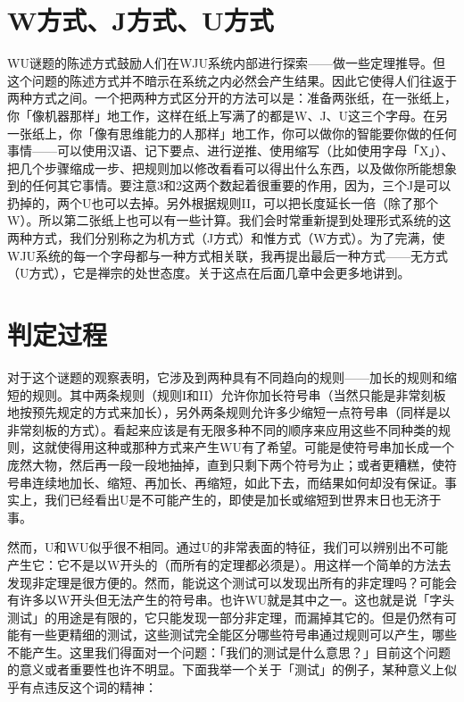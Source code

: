 \documentclass[
  12pt,
  twoside,
  openright,
  oldfontcommands,
]{memoir}
\begin{document}
\section{W方式、J方式、U方式}

WU谜题的陈述方式鼓励人们在WJU系统内部进行探索------做一些定理推导。但这个问题的陈述方式并不暗示在系统之内必然会产生结果。因此它使得人们往返于两种方式之间。一个把两种方式区分开的方法可以是：准备两张纸，在一张纸上，你「像机器那样」地工作，这样在纸上写满了的都是W、J、U这三个字母。在另一张纸上，你「像有思维能力的人那样」地工作，你可以做你的智能要你做的任何事情------可以使用汉语、记下要点、进行逆推、使用缩写（比如使用字母「X」）、把几个步骤缩成一步、把规则加以修改看看可以得出什么东西，以及做你所能想象到的任何其它事情。要注意3和2这两个数起着很重要的作用，因为，三个J是可以扔掉的，两个U也可以去掉。另外根据规则II，可以把长度延长一倍（除了那个W）。所以第二张纸上也可以有一些计算。我们会时常重新提到处理形式系统的这两种方式，我们分别称之为机方式（J方式）和惟方式（W方式）。为了完满，使WJU系统的每一个字母都与一种方式相关联，我再提出最后一种方式------无方式（U方式），它是禅宗的处世态度。关于这点在后面几章中会更多地讲到。

\section{判定过程}

对于这个谜题的观察表明，它涉及到两种具有不同趋向的规则------加长的规则和缩短的规则。其中两条规则（规则I和II）允许你加长符号串（当然只能是非常刻板地按预先规定的方式来加长），另外两条规则允许多少缩短一点符号串（同样是以非常刻板的方式）。看起来应该是有无限多种不同的顺序来应用这些不同种类的规则，这就使得用这种或那种方式来产生WU有了希望。可能是使符号串加长成一个庞然大物，然后再一段一段地抽掉，直到只剩下两个符号为止；或者更糟糕，使符号串连续地加长、缩短、再加长、再缩短，如此下去，而结果如何却没有保证。事实上，我们已经看出U是不可能产生的，即使是加长或缩短到世界末日也无济于事。

然而，U和WU似乎很不相同。通过U的非常表面的特征，我们可以辨别出不可能产生它：它不是以W开头的（而所有的定理都必须是）。用这样一个简单的方法去发现非定理是很方便的。然而，能说这个测试可以发现出所有的非定理吗？可能会有许多以W开头但无法产生的符号串。也许WU就是其中之一。这也就是说「字头测试」的用途是有限的，它只能发现一部分非定理，而漏掉其它的。但是仍然有可能有一些更精细的测试，这些测试完全能区分哪些符号串通过规则可以产生，哪些不能产生。这里我们得面对一个问题：「我们的测试是什么意思？」目前这个问题的意义或者重要性也许不明显。下面我举一个关于「测试」的例子，某种意义上似乎有点违反这个词的精神：
\end{document}
